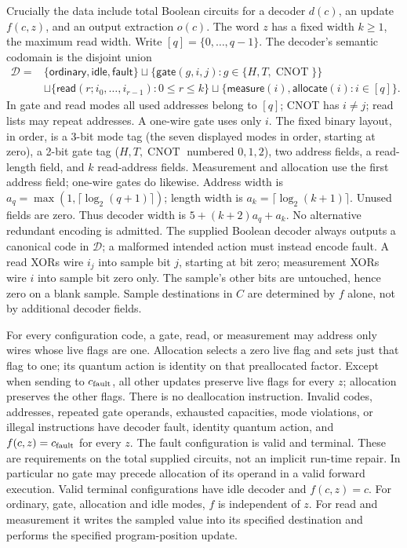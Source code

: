 \begin{definition}
Crucially the data include total Boolean circuits for a decoder $d(c)$,
an update $f(c,z)$, and an output extraction $o(c)$. The word $z$ has a
fixed width $k\geq1$, the maximum read width. Write $[q]=\{0,\ldots,q-1\}$.
The decoder's semantic codomain is the disjoint union
\[
 \begin{split}
 \mathcal D={}&\{\mathsf{ordinary},\mathsf{idle},\mathsf{fault}\}
 \sqcup\{\mathsf{gate}(g,i,j):g\in\{H,T,\operatorname{CNOT}\}\}\\
 &\sqcup\{\mathsf{read}(r;i_0,\ldots,i_{r-1}):0\leq r\leq k\}
 \sqcup\{\mathsf{measure}(i),\mathsf{allocate}(i):i\in[q]\}.
 \end{split}
\]
In gate and read modes all used addresses belong to $[q]$; CNOT has
$i\ne j$; read lists may repeat addresses. A one-wire gate uses
only $i$. The fixed binary layout, in order, is a 3-bit mode tag (the
seven displayed modes in order, starting at zero), a 2-bit gate tag
($H,T,\operatorname{CNOT}$ numbered $0,1,2$), two address fields, a
read-length field, and $k$ read-address fields. Measurement and allocation
use the first address field; one-wire gates do likewise. Address width is
$a_q=\max(1,\lceil\log_2(q+1)\rceil)$; length width is
$a_k=\lceil\log_2(k+1)\rceil$. Unused fields are zero. Thus decoder
width is $5+(k+2)a_q+a_k$. No alternative redundant encoding is admitted.
The supplied Boolean decoder always outputs a canonical code in
$\mathcal D$; a malformed intended action must instead encode fault.
A read XORs wire $i_j$ into sample bit $j$, starting at bit zero;
measurement XORs wire $i$ into sample bit zero only. The sample's other
bits are untouched, hence zero on a blank sample. Sample destinations
in $C$ are determined by $f$ alone, not by additional decoder fields.

For every configuration code, a gate, read, or measurement may address
only wires whose live flags are one. Allocation selects a zero live
flag and sets just that flag to one; its quantum action is identity on
that preallocated factor. Except when sending to $c_{\rm fault}$, all
other updates preserve live flags for every $z$; allocation preserves
the other flags. There is no deallocation instruction. Invalid codes,
addresses, repeated gate operands, exhausted capacities, mode violations,
or illegal instructions have decoder fault, identity quantum action,
and $f(c,z)=c_{\rm fault}$ for every $z$. The fault configuration is valid
and terminal. These are requirements on the total supplied circuits,
not an implicit run-time repair. In particular no gate may precede
allocation of its operand in a valid forward execution.
Valid terminal configurations have idle decoder and $f(c,z)=c$.
For ordinary, gate, allocation and idle modes, $f$ is independent of $z$.
For read and measurement it writes the sampled value into its specified
destination and performs the specified program-position update.


\end{definition}

